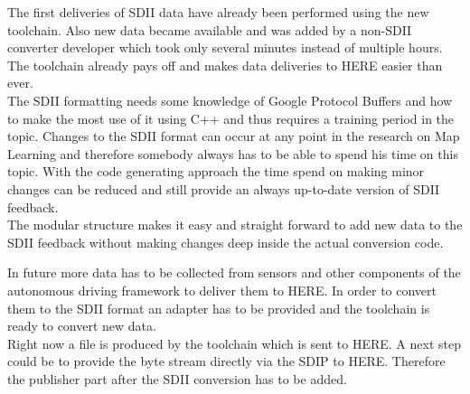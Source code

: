 The first deliveries of SDII data have already been performed using the new toolchain. Also new data became available and was added by a non-SDII converter developer which took only several minutes instead of multiple hours. The toolchain already pays off and makes data deliveries to HERE easier than ever.\\
The SDII formatting needs some knowledge of Google Protocol Buffers and how to make the most use of it using C++ and thus requires a training period in the topic. Changes to the SDII format can occur at any point in the research on Map Learning and therefore somebody always has to be able to spend his time on this topic. With the code generating approach the time spend on making minor changes can be reduced and still provide an always up-to-date version of SDII feedback.\\
The modular structure makes it easy and straight forward to add new data to the SDII feedback without making changes deep inside the actual conversion code.\par
In future more data has to be collected from sensors and other components of the autonomous driving framework to deliver them to HERE. In order to convert them to the SDII format an adapter has to be provided and the toolchain is ready to convert new data.\\
Right now a file is produced by the toolchain which is sent to HERE. A next step could be to provide the byte stream directly via the \acf{SDIP} to HERE. Therefore the publisher part after the SDII conversion has to be added.
